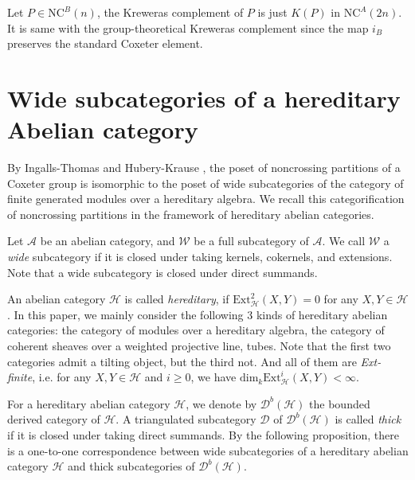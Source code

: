 \documentclass[a4paper, 11pt, reqno]{amsart}
\numberwithin{equation}{section}
\theoremstyle{remark}
\theoremstyle{definition}
\begin{document}
Let $P \in \mathrm{NC}^B(n)$, the Kreweras complement of $P$ is just $K(P)$ in $\mathrm{NC}^A(2n)$. It is same with the group-theoretical Kreweras complement since the map $i_B$ preserves the standard Coxeter element. %







\section{Wide subcategories of a hereditary Abelian category}

By Ingalls-Thomas \cite{ingalls2009noncrossing} and Hubery-Krause \cite{hubery2016categorification}, the poset of noncrossing partitions of a Coxeter group is isomorphic to the poset of wide subcategories of the category of finite generated modules over a hereditary algebra. We recall this categorification  of noncrossing partitions in the framework of hereditary abelian categories.

Let $\mathcal A$ be an abelian category, and $\mathcal W$ be a full subcategory of $\mathcal A$. We call $\mathcal W$ a \emph{wide} subcategory if it is closed under taking kernels, cokernels, and extensions. Note that a wide subcategory is closed under direct summands.

An abelian category $\mathcal H$ is called \emph{hereditary}, if $\mathrm{Ext}_{\mathcal H}^2(X,Y)=0$ for any $X,Y \in \mathcal H$. In this paper, we mainly consider the following 3 kinds of hereditary abelian categories: the category of modules over a hereditary algebra, the category of coherent sheaves over a weighted projective line, tubes. Note that the first two categories admit a tilting object, but the third not. And all of them are \emph{Ext-finite}, i.e. for any $X,Y \in \mathcal H$ and $i \geq 0$, we have $\mathrm{dim}_k \mathrm{Ext}_{\mathcal H}^i(X,Y)< \infty$.


For a hereditary abelian category $\mathcal H$, we denote by $\mathcal D^b(\mathcal H)$ the bounded derived category of $\mathcal H$. A triangulated subcategory $\mathcal D$ of $\mathcal D^b(\mathcal H)$ is called \emph{thick} if it is closed under taking direct summands. By the following proposition, there is a one-to-one correspondence between wide subcategories of a hereditary abelian category $\mathcal H$ and thick subcategories of $\mathcal D^b(\mathcal H)$.
\end{document}
